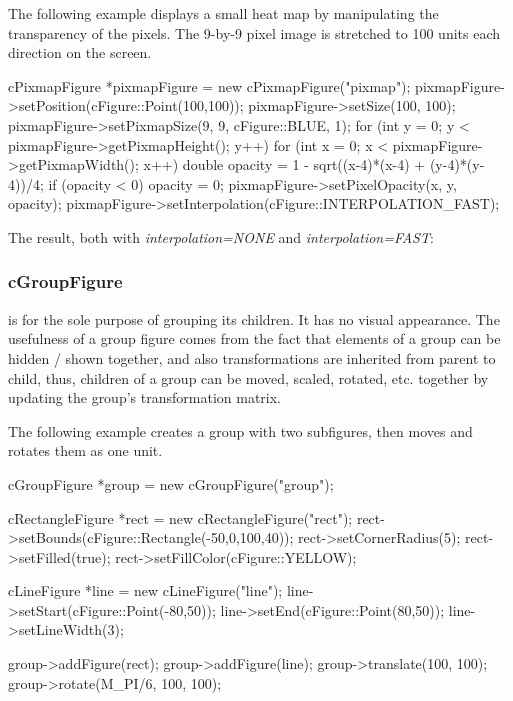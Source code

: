 The following example displays a small heat map by manipulating the
transparency of the pixels. The 9-by-9 pixel image is stretched to
100 units each direction on the screen.

\begin{cpp}
cPixmapFigure *pixmapFigure = new cPixmapFigure("pixmap");
pixmapFigure->setPosition(cFigure::Point(100,100));
pixmapFigure->setSize(100, 100);
pixmapFigure->setPixmapSize(9, 9, cFigure::BLUE, 1);
for (int y = 0; y < pixmapFigure->getPixmapHeight(); y++) {
    for (int x = 0; x < pixmapFigure->getPixmapWidth(); x++) {
        double opacity = 1 - sqrt((x-4)*(x-4) + (y-4)*(y-4))/4;
        if (opacity < 0) opacity = 0;
        pixmapFigure->setPixelOpacity(x, y, opacity);
    }
}
pixmapFigure->setInterpolation(cFigure::INTERPOLATION_FAST);
\end{cpp}


The result, both with \textit{interpolation=NONE} and \textit{interpolation=FAST}:

\begin{center}
\end{center}


\subsubsection{cGroupFigure}
\label{sec:graphics:groupfigure}

 is for the sole purpose of grouping its children. It
has no visual appearance. The usefulness of a group figure comes from the
fact that elements of a group can be hidden / shown together, and also
transformations are inherited from parent to child, thus, children of a
group can be moved, scaled, rotated, etc. together by updating the group's
transformation matrix.

The following example creates a group with two subfigures, then moves and
rotates them as one unit.

\begin{cpp}
cGroupFigure *group = new cGroupFigure("group");

cRectangleFigure *rect = new cRectangleFigure("rect");
rect->setBounds(cFigure::Rectangle(-50,0,100,40));
rect->setCornerRadius(5);
rect->setFilled(true);
rect->setFillColor(cFigure::YELLOW);

cLineFigure *line = new cLineFigure("line");
line->setStart(cFigure::Point(-80,50));
line->setEnd(cFigure::Point(80,50));
line->setLineWidth(3);

group->addFigure(rect);
group->addFigure(line);
group->translate(100, 100);
group->rotate(M_PI/6, 100, 100);
\end{cpp}

